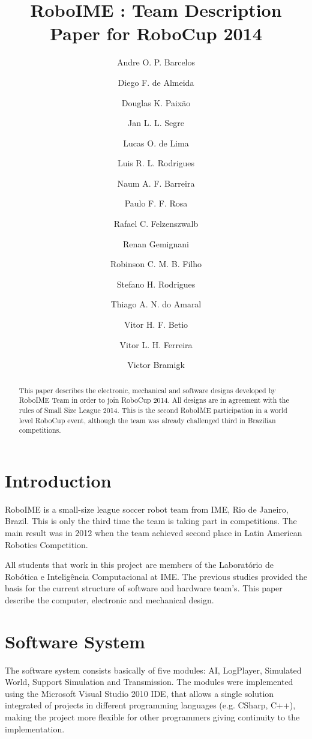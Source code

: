 \documentclass{llncs}
\begin{document}
\title{RoboIME : Team Description Paper for RoboCup 2014}
\author{
 Andre O. P. Barcelos \and
 Diego F. de Almeida \and
 Douglas K. Paixão \and
 Jan L. L. Segre \and
 Lucas O. de Lima \and
 Luis R. L. Rodrigues \and
 Naum A. F. Barreira \and
 Paulo F. F. Rosa \and
 Rafael C. Felzenszwalb \and
 Renan Gemignani \and
 Robinson C. M. B. Filho \and
 Stefano H. Rodrigues \and
 Thiago A. N. do Amaral \and
 Vitor H. F. Betio \and
 Vitor L. H. Ferreira \and
 Victor Bramigk
}

\maketitle
%
\begin{abstract}
This paper describes the electronic, mechanical and software designs developed by RoboIME Team in order to join RoboCup 2014. All designs are in agreement with the rules of Small Size League 2014. This is the second RoboIME participation in a world level RoboCup event, although the team was already challenged third in Brazilian competitions.
\end{abstract}

\section{Introduction}
    RoboIME is a small-size league soccer robot team from IME, Rio de Janeiro, Brazil. This is only the third time the team is taking part in competitions. The main result was in 2012 when the team achieved second place in Latin American Robotics Competition.

All students that work in this project are members of the Laboratório de Robótica e Inteligência Computacional at IME. The previous studies \cite{alexandre}\cite{marco} provided the basis for the current structure of software and hardware team's. This paper describe the computer, electronic and mechanical design.

\section{Software System}
	The software system consists basically of five modules: AI, LogPlayer, Simulated World, Support Simulation and Transmission. The modules were implemented using the Microsoft Visual Studio 2010 IDE, that allows a single solution integrated of projects in different programming languages (e.g. CSharp, C++), making the project more flexible for other programmers giving continuity to the implementation.
\end{document}

